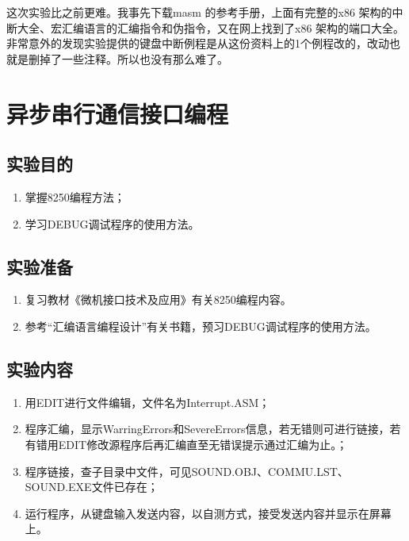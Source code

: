 \documentclass{ctexart}
\newif\ifFour\Fourfalse
\begin{document}
	这次实验比之前更难。我事先下载masm 的参考手册，上面有完整的x86 架构的中断大全、宏汇编语言的汇编指令和伪指令，又在网上找到了x86 架构的端口大全。非常意外的发现实验提供的键盘中断例程是从这份资料上的1个例程改的，改动也就是删掉了一些注释。所以也没有那么难了。

\fi


\ifFour

	\section{异步串行通信接口编程}%
	\label{sec:异步串行通信接口编程}

	\subsection{实验目的}%
	\label{sub:实验目的\chinese{section}}

	\begin{enumerate}
		\item 掌握8250编程方法；
		\item 学习DEBUG调试程序的使用方法。
	\end{enumerate}

	\subsection{实验准备}%
	\label{sub:实验准备}

	\begin{enumerate}
		\item 复习教材《微机接口技术及应用》有关8250编程内容。
		\item 参考\enquote{汇编语言编程设计}有关书籍，预习DEBUG调试程序的使用方法。
	\end{enumerate}

	\subsection{实验内容}%
	\label{sub:实验内容}

	\begin{enumerate}
		\item 用EDIT进行文件编辑，文件名为Interrupt.ASM；
		\item 程序汇编，显示WarringErrors和SevereErrors信息，若无错则可进行链接，若有错用EDIT修改源程序后再汇编直至无错误提示通过汇编为止。；
		\item 程序链接，查子目录中文件，可见SOUND.OBJ、COMMU.LST、SOUND.EXE文件已存在；
		\item 运行程序，从键盘输入发送内容，以自测方式，接受发送内容并显示在屏幕上。
	\end{enumerate}
\end{document}
